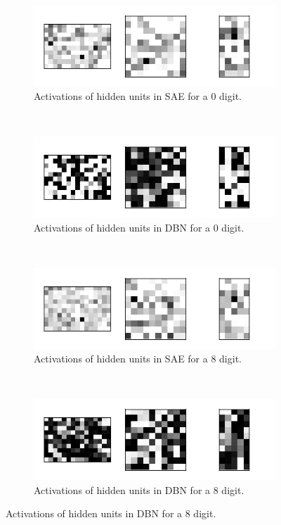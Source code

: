\documentclass{article}
\begin{document}
\begin{figure}[!ht]
  \centering
  \begin{subfigure}[t]{0.47\textwidth}
    \centering
    \includegraphics[width=\textwidth]{../plots/3_2_2/sae_d0_activations.png}
    \caption{Activations of hidden units in SAE for a 0 digit.}
  \end{subfigure}
  ~
  \begin{subfigure}[t]{0.47\textwidth}
    \centering
    \includegraphics[width=\textwidth]{../plots/3_2_2/dbn_d0_activations.png}
    \caption{Activations of hidden units in DBN for a 0 digit.}
  \end{subfigure}
  ~
  \begin{subfigure}[t]{0.47\textwidth}
    \centering
    \includegraphics[width=\textwidth]{../plots/3_2_2/sae_d8_activations.png}
    \caption{Activations of hidden units in SAE for a 8 digit.}
  \end{subfigure}
  ~
  \begin{subfigure}[t]{0.47\textwidth}
    \centering
    \includegraphics[width=\textwidth]{../plots/3_2_2/dbn_d8_activations.png}
    \caption{Activations of hidden units in DBN for a 8 digit.}
  \end{subfigure}
\end{figure}
\end{document}
